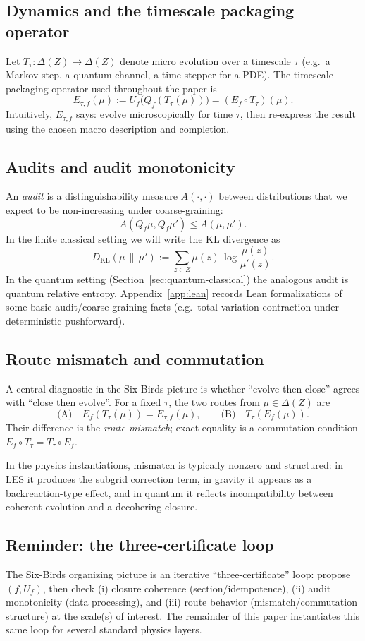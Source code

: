 \documentclass[11pt]{article}
\providecommand{\Z}{Z}
\providecommand{\Dist}[1]{\Delta(#1)}
\providecommand{\Lens}{f}
\providecommand{\Qf}{Q_f}
\providecommand{\Uf}{U_f}
\providecommand{\Etauf}{E_{\tau,f}}
\providecommand{\DKL}[2]{D_{\mathrm{KL}}\!\left(#1\,\|\,#2\right)}
\begin{document}
\subsection{Dynamics and the timescale packaging operator}
Let $T_\tau:\Dist{\Z}\to\Dist{\Z}$ denote micro evolution over a timescale $\tau$ (e.g.\ a Markov step, a quantum channel, a time-stepper for a PDE). The timescale packaging operator used throughout the paper is
\[
  \Etauf(\mu) := \Uf\!\bigl(\Qf(T_\tau(\mu))\bigr) = (E_f\circ T_\tau)(\mu).
\]
Intuitively, $\Etauf$ says: evolve microscopically for time $\tau$, then re-express the result using the chosen macro description and completion.

\subsection{Audits and audit monotonicity}
An \emph{audit} is a distinguishability measure $A(\cdot,\cdot)$ between distributions that we expect to be non-increasing under coarse-graining:
\[
  A(\Qf\mu,\Qf\mu') \le A(\mu,\mu').
\]
In the finite classical setting we will write the KL divergence as
\[
  \DKL{\mu}{\mu'} := \sum_{z\in\Z} \mu(z)\,\log\!\frac{\mu(z)}{\mu'(z)}.
\]
In the quantum setting (Section~\ref{sec:quantum-classical}) the analogous audit is quantum relative entropy. Appendix~\ref{app:lean} records Lean formalizations of some basic audit/coarse-graining facts (e.g.\ total variation contraction under deterministic pushforward).

\subsection{Route mismatch and commutation}
A central diagnostic in the Six-Birds picture is whether ``evolve then close'' agrees with ``close then evolve''. For a fixed $\tau$, the two routes from $\mu\in\Dist{\Z}$ are
\[
  \text{(A)}\quad E_f(T_\tau(\mu))=\Etauf(\mu),
  \qquad
  \text{(B)}\quad T_\tau(E_f(\mu)).
\]
Their difference is the \emph{route mismatch}; exact equality is a commutation condition $E_f\circ T_\tau = T_\tau\circ E_f$.

In the physics instantiations, mismatch is typically nonzero and structured: in LES it produces the subgrid correction term, in gravity it appears as a backreaction-type effect, and in quantum it reflects incompatibility between coherent evolution and a decohering closure.

\subsection{Reminder: the three-certificate loop}
The Six-Birds organizing picture is an iterative ``three-certificate'' loop: propose $(\Lens,\Uf)$, then check (i) closure coherence (section/idempotence), (ii) audit monotonicity (data processing), and (iii) route behavior (mismatch/commutation structure) at the scale(s) of interest. The remainder of this paper instantiates this same loop for several standard physics layers.
\end{document}
